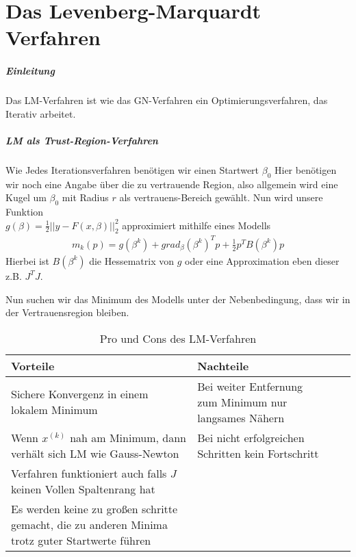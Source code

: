 \documentclass[a4paper,10pt]{scrartcl}
\begin{document}
\section{Das Levenberg-Marquardt Verfahren}
\subparagraph{Einleitung}
Das LM-Verfahren ist wie das GN-Verfahren ein Optimierungsverfahren, das Iterativ arbeitet.


\subparagraph{LM als Trust-Region-Verfahren}
Wie Jedes Iterationsverfahren benötigen wir einen Startwert $\beta_0$
Hier benötigen wir noch eine Angabe über die zu vertrauende Region, also allgemein wird eine Kugel um $\beta_0$ mit Radius $r$ als vertrauens-Bereich gewählt.
Nun wird unsere Funktion\\ $g(\beta)=\frac{1}{2}||y-F(x,\beta)||_2^2$ approximiert mithilfe eines Modells
\begin{align}
m_k(p)=g(\beta^k)+grad_{\beta}(\beta^k)^Tp+\frac{1}{2}p^TB(\beta^k)p
\end{align}
Hierbei ist $B(\beta^k)$ die Hessematrix von $g$ oder eine Approximation eben dieser z.B. $J^TJ$.


Nun suchen wir das Minimum des Modells unter der Nebenbedingung, dass wir in der Vertrauensregion bleiben.
\begin{table}[!h]
 \caption{Pro und Cons des LM-Verfahren}
 \label{tab:table1}
\begin{tabular}{ |p{6cm}|p{6cm}|l |l| }
 \hline
    Vorteile & Nachteile\\
   \hline
   Sichere Konvergenz in einem lokalem Minimum &
   Bei weiter Entfernung zum Minimum nur langsames Nähern\\
   \hline
   Wenn $x^{(k)}$ nah am Minimum, dann verhält sich LM wie Gauss-Newton &Bei nicht erfolgreichen Schritten kein Fortschritt \\
   \hline
   Verfahren funktioniert auch falls $J$ keinen Vollen Spaltenrang hat&\\
   \hline
   Es werden keine zu großen schritte
    gemacht, die zu anderen Minima
    trotz guter Startwerte führen&\\
    \hline




 \end{tabular}
\end{table}

\nocite{*}


\end{document}
